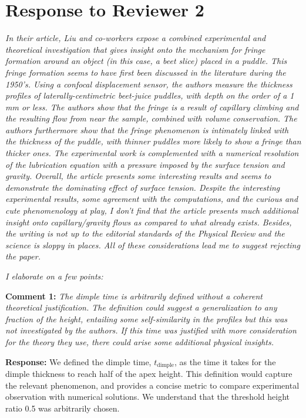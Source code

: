 \documentclass[11pt]{article}
\begin{document}
\section*{Response to Reviewer 2}

\begin{siderules}
\textit{In their article, Liu and co-workers expose a combined experimental and theoretical investigation that gives insight onto the mechanism for fringe formation around an object (in this case, a beet slice) placed in a puddle. This fringe formation seems to have first been discussed in the literature during the 1950’s. Using a confocal displacement sensor, the authors measure the thickness profiles of laterally-centimetric beet-juice puddles, with depth on the order of a 1 mm or less. The authors show that the fringe is a result of capillary climbing and the resulting flow from near the sample, combined with volume conservation. The authors furthermore show that the fringe phenomenon is intimately linked with the thickness of the puddle, with thinner puddles more likely to show a fringe than thicker ones. The experimental work is complemented with a numerical resolution of the lubrication equation with a pressure imposed by the surface tension and gravity. Overall, the article presents some interesting results and seems to demonstrate the dominating effect of surface tension. Despite the interesting experimental results, some agreement with the computations, and the curious and cute phenomenology at play, I don’t find that the article presents much additional insight onto capillary/gravity flows as compared to what already exists. Besides, the writing is not up to the editorial standards of the Physical Review and the science is sloppy in places. All of these considerations lead me to suggest rejecting the paper.}

\textit{I elaborate on a few points:}
\end{siderules}

\bigskip
\begin{siderules}
\textbf{Comment 1:} \textit{The dimple time is arbitrarily defined without a coherent theoretical justification. The definition could suggest a generalization to any fraction of the height, entailing some self-similarity in the profiles but this was not investigated by the authors. If this time was justified with more consideration for the theory they use, there could arise some additional physical insights.}
\end{siderules}

\textbf{Response:} We defined the dimple time, $t_\mathrm{dimple}$, as the time it takes for the dimple thickness to reach half of the apex height. 
This definition would capture the relevant phenomenon, and provides a concise metric to compare experimental observation with numerical solutions. We understand that the threshold height ratio 0.5 was arbitrarily chosen. 
\end{document}
